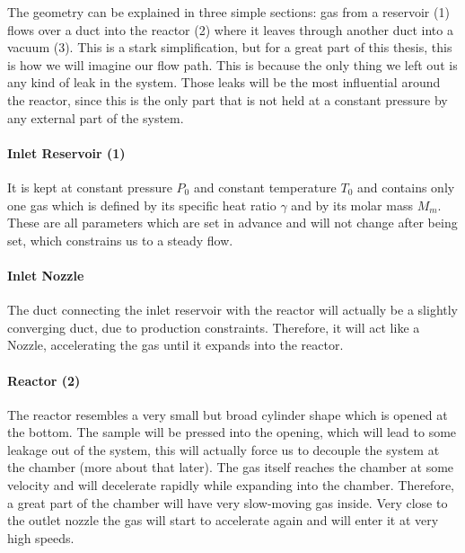 	The geometry can be explained in three simple sections: gas from a reservoir (1) flows over a duct into the reactor (2) where it leaves through another duct into a vacuum (3).
	This is a stark simplification, but for a great part of this thesis, this is how we will imagine our flow path.
	This is because the only thing we left out is any kind of leak in the system.
	Those leaks will be the most influential around the reactor, since this is the only part that is not held at a constant pressure by any external part of the system.\\
	

\paragraph{Inlet Reservoir (1)}

	It is kept at constant pressure \(P_0\) and constant temperature \(T_0\) and contains only one gas which is defined by its specific heat ratio \(\gamma\) and by its molar mass \(M_m\).
	These are all parameters which are set in advance and will not change after being set, which constrains us to a steady flow.
	
\paragraph{Inlet Nozzle}

	The duct connecting the inlet reservoir with the reactor will actually be a slightly converging duct, due to production constraints.
	Therefore, it will act like a Nozzle, accelerating the gas until it expands into the reactor.
	
\paragraph{Reactor (2)}
	
	The reactor resembles a very small but broad cylinder shape which is opened at the bottom.
	The sample will be pressed into the opening, which will lead to some leakage out of the system, this will actually force us to decouple the system at the chamber (more about that later).
	The gas itself reaches the chamber at some velocity and will decelerate rapidly while expanding into the chamber.
	Therefore, a great part of the chamber will have very slow-moving gas inside.
	Very close to the outlet nozzle the gas will start to accelerate again and will enter it at very high speeds.
	
